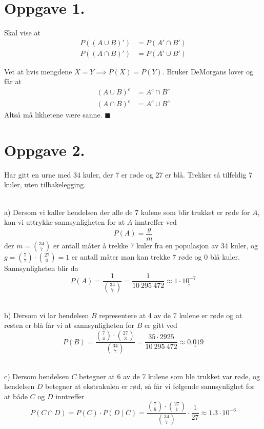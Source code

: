 \documentclass[a4paper,11pt,norsk]{article}
\begin{document}


\section*{Oppgave 1.}
Skal vise at
\begin{align*}
    P\left((A \cup B)'\right) &= P\left(A' \cap B'\right) \\
    P\left((A \cap B)'\right) &= P\left(A' \cup B'\right)
\end{align*}

Vet at hvis mengdene $X = Y \implies P(X) = P(Y)$. Bruker DeMorgans lover og får at 
\begin{align*}
    (A \cup B)^c &= A^c \cap B^c \\ 
    (A \cap B)^c &= A^c \cup B^c
\end{align*}
Altså må likhetene være sanne. $\blacksquare$

\section*{Oppgave 2.}
Har gitt en urne med 34 kuler, der 7 er røde og 27 er blå. Trekker så tilfeldig 7 kuler, uten tilbakelegging.

\hphantom{newline}\\
a) Dersom vi kaller hendelsen der alle de 7 kulene som blir trukket er røde for $A$, kan vi uttrykke sannsynligheten for at $A$ 
inntreffer ved
\[P(A) = \frac{g}{m}\]
der $m = \binom{34}{7}$ er antall måter å trekke 7 kuler fra en populasjon av 34 kuler, og $g = \binom{7}{7} \cdot \binom{27}{0} = 1$ 
er antall måter man kan trekke 7 røde og 0 blå kuler. Sannsynligheten blir da 
\[
    P(A) = \frac{1}{\binom{34}{7}} = \frac{1}{10\:295\:472} \approx 1 \cdot \underline{\underline{10^{-7}}} 
\]

\hphantom{newline}\\
b) Dersom vi lar hendelsen $B$ representere at 4 av de 7 kulene er røde og at resten er blå får vi at 
sannsynligheten for $B$ er gitt ved
\[
    P(B) = \frac{\binom{7}{4} \cdot \binom{27}{3}}{\binom{34}{7}} = \frac{35 \cdot 2925}{10\:295\:472} \approx \underline{\underline{0.019}}
\]

\hphantom{newline}\\
c) Dersom hendelsen $C$ betegner at 6 av de 7 kulene som ble trukket var røde, og hendelsen $D$ betegner at ekstrakulen er rød,
så får vi følgende sannsynlighet for at både $C$ og $D$ inntreffer
\[
    P(C \cap D) = P(C) \cdot P(D \mid C) = \frac{\binom{7}{6} \cdot \binom{27}{1}}{\binom{34}{7}} \cdot \frac{1}{27} \approx \underline{\underline{1.3 \cdot 10^{-6}}}
\]
\end{document}
